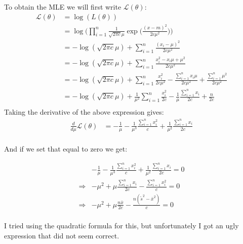 
To obtain the MLE we will first write $\mathcal{L}(\theta)$:
\begin{align*}
    \mathcal{L}(\theta) &= \log(L(\theta))\\
                        &=\log\Big(\prod_{i=1}^n\frac{1}{\sqrt{2\pi c}\mu}\exp\Big(\frac{(x-m)^2}{2c\mu^2}\Big)\Big)\\
                        &=-\log (\sqrt{2\pi c}\mu) + \sum_{i=1}^n\frac{(x_i - \mu)^2}{2c\mu^2}\\
                        &=-\log (\sqrt{2\pi c}\mu) + \sum_{i=1}^n\frac{x_i^2 - x_i\mu + \mu^2}{2c\mu^2}\\
                        &=-\log (\sqrt{2\pi c}\mu) + \sum_{i=1}^n\frac{x_i^2}{2c\mu^2} -\frac{\sum_{i=1}^n x_i\mu}{2c\mu^2} +\frac{\sum_{i=1}^n \mu^2}{2c\mu^2}\\
                        &=-\log (\sqrt{2\pi c}\mu) + \frac{1}{\mu^2}\sum_{i=1}^n\frac{x_i^2}{2c} -\frac{1}{\mu}\frac{\sum_{i=1}^n x_i}{2c} +\frac{n}{2c}\\
\end{align*}
Taking the derivative of the above expression gives:
\begin{align*}
    \frac{d }{d \mu} \mathcal{L}(\theta)&=-\frac{1}{\mu} - \frac{1}{\mu^3}\frac{\sum_{i=1}^nx_i^2}{c} +\frac{1}{\mu^2}\frac{\sum_{i=1}^n x_i}{2c} \\
\end{align*}

And if we set that equal to zero we get:

\begin{align*}
      &-\frac{1}{\mu} - \frac{1}{\mu^3}\frac{\sum_{i=1}^nx_i^2}{c} +\frac{1}{\mu^2}\frac{\sum_{i=1}^n x_i}{2c}= 0\\
    \Rightarrow&-\mu^2  + \mu\frac{\sum_{i=1}^n x_i}{2c} - \frac{\sum_{i=1}^n x_i^2}{c}= 0\\
    \Rightarrow&-\mu^2  + \mu\frac{n\bar{x}}{2c} - \frac{n (\tilde{s}^2-\bar{x}^2)} {c}= 0\\
\end{align*}

I tried using the quadratic formula for this, but unfortunately I got an ugly expression that did not seem correct.

